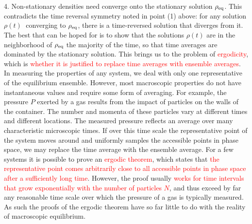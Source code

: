 \documentclass[12pt,a4paper]{article}
\newcounter{theo}[section]\setcounter{theo}{0}
\begin{document}
4. Non-stationary densities need converge onto the stationary solution $\rho_{\rm eq}$. This contradicts the time reversal symmetry noted in point (1) above: for any solution $\rho(t)$􏱑 converging to $\rho_{\rm eq}$, there is a time-reversed solution that diverges from it. The best that can be hoped for is to show that the solutions $\rho(t)$ are in the neighborhood of $\rho_{\rm eq}$ the majority of the time, so that time averages are dominated by the stationary solution. This brings us to the problem of \textcolor{red}{ergodicity}, which is \textcolor{red}{whether it is justified to replace time averages with ensemble averages}. In measuring the properties of any system, we deal with only one representative of the equilibrium ensemble. However, most macroscopic properties do not have instantaneous values and require some form of averaging. For example, the pressure $P$ exerted by a gas results from the impact of particles on the walls of the container. The number and momenta of these particles vary at different times and different locations. The measured pressure reflects an average over many characteristic microscopic times. If over this time scale the representative point of the system moves around and uniformly samples the accessible points in phase space, we may replace the time average with the ensemble average. For a few systems it is possible to prove an \textcolor{red}{ergodic theorem}, which states that \textcolor{red}{the representative point comes arbitrarily close to all accessible points in phase space after a sufficiently long time}. However, the proof usually \textcolor{red}{works for time intervals that grow exponentially with the number of particles $N$}, and thus exceed by far any reasonable time scale over which the pressure of a gas is typically measured. As such the proofs of the ergodic theorem have so far little to do with the reality of macroscopic equilibrium.
\end{document}
